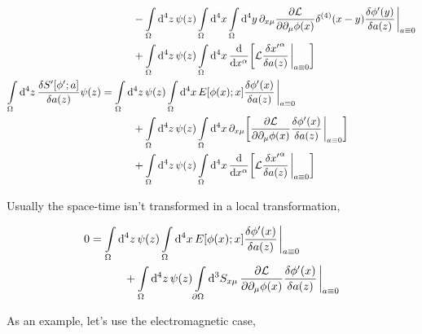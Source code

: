 \begin{align}
    &\quad\quad\quad-\int\limits_\Omega\dd[4]{z}\psi(z)\int\limits_{\Omega}\dd[4]{x}\int\limits_{\Omega}\dd[4]{y}\partial_{x\mu}\pdv{\mathcal L}{\partial_{\mu}\phi\qty(x)}\delta^{\qty(4)}\qty(x-y)\fdv{\phi'\qty(y)}{a(z)}\eval_{a\equiv0}\nonumber\\
    &\quad\quad\quad+\int\limits_\Omega\dd[4]{z}\psi(z)\int\limits_{\Omega}\dd[4]{x}\dv{}{x^\alpha}\qty[\mathcal L\fdv{{x'}^\alpha}{a(z)}\eval_{a\equiv0}]\\
    \int\limits_\Omega\dd[4]{z}\fdv{S'[\phi';a]}{a\qty(z)}\psi\qty(z)&=\int\limits_\Omega\dd[4]{z}\psi(z)\int\limits_{\Omega}\dd[4]{x}E\qty[\phi\qty(x);x]\fdv{\phi'\qty(x)}{a(z)}\eval_{a\equiv0}\nonumber\\
    &\quad\quad\quad+\int\limits_\Omega\dd[4]{z}\psi(z)\int\limits_{\Omega}\dd[4]{x}\partial_{x\mu}\qty[\pdv{\mathcal L}{\partial_{\mu}\phi\qty(x)}\fdv{\phi'\qty(x)}{a(z)}\eval_{a\equiv0}]\nonumber\\
    &\quad\quad\quad+\int\limits_\Omega\dd[4]{z}\psi(z)\int\limits_{\Omega}\dd[4]{x}\dv{}{x^\alpha}\qty[\mathcal L\fdv{{x'}^\alpha}{a(z)}\eval_{a\equiv0}]
\end{align}

Usually the space-time isn't transformed in a local transformation,

\begin{align}
    0&=\int\limits_\Omega\dd[4]{z}\psi(z)\int\limits_{\Omega}\dd[4]{x}E\qty[\phi\qty(x);x]\fdv{\phi'\qty(x)}{a(z)}\eval_{a\equiv0}\nonumber\\
    &\quad\quad\quad+\int\limits_\Omega\dd[4]{z}\psi(z)\int\limits_{\partial\Omega}\dd[3]{S_{x\mu}}\pdv{\mathcal L}{\partial_{\mu}\phi\qty(x)}\fdv{\phi'\qty(x)}{a(z)}\eval_{a\equiv0}
\end{align}

As an example, let's use the electromagnetic case,


